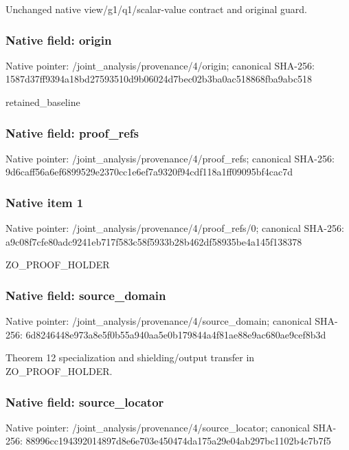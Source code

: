 \documentclass[10pt,a4paper]{article}
\begin{document}
\begingroup\raggedright\sloppy Unchanged native view/\allowbreak{}g1/\allowbreak{}q1/\allowbreak{}scalar-value contract and original guard.\par\endgroup

\subsubsection{Native field: origin}
Native pointer: /joint\_\allowbreak{}analysis/provenance/4/origin; canonical SHA-256: 1587d37ff9394a18bd27593510d9b06024d7bec02b3ba0ac518868fba9abc518

\begingroup\raggedright\sloppy retained\_\allowbreak{}baseline\par\endgroup

\subsubsection{Native field: proof\_\allowbreak{}refs}
Native pointer: /joint\_\allowbreak{}analysis/provenance/4/proof\_\allowbreak{}refs; canonical SHA-256: 9d6caff56a6ef6899529e2370cc1e6ef7a9320f94cdf118a1ff09095bf4cac7d

\subsubsection{Native item 1}
Native pointer: /joint\_\allowbreak{}analysis/provenance/4/proof\_\allowbreak{}refs/0; canonical SHA-256: a9c08f7cfe80adc9241eb717f583c58f5933b28b462df58935be4a145f138378

\begingroup\raggedright\sloppy ZO\_\allowbreak{}PROOF\_\allowbreak{}HOLDER\par\endgroup

\subsubsection{Native field: source\_\allowbreak{}domain}
Native pointer: /joint\_\allowbreak{}analysis/provenance/4/source\_\allowbreak{}domain; canonical SHA-256: 6d8246448e973a8e5f0b55a940aa5e0b179844a4f81ae88e9ac680ae9cef8b3d

\begingroup\raggedright\sloppy Theorem 12 specialization and shielding/\allowbreak{}output transfer in ZO\_\allowbreak{}PROOF\_\allowbreak{}HOLDER.\par\endgroup

\subsubsection{Native field: source\_\allowbreak{}locator}
Native pointer: /joint\_\allowbreak{}analysis/provenance/4/source\_\allowbreak{}locator; canonical SHA-256: 88996cc194392014897d8e6e703e450474da175a29e04ab297bc1102b4c7b7f5
\end{document}
